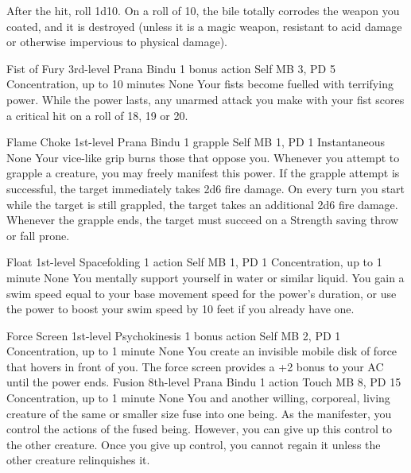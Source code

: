 After the hit, roll 1d10. On a roll of 10, the bile totally
corrodes the weapon you coated, and it is destroyed (unless
it is a magic weapon, resistant to acid damage or otherwise
impervious to physical damage).

\DndPowerHeader%
    {Fist of Fury\label{pwr:fist_of_fury}}
    {3rd-level Prana Bindu}
    {1 bonus action}
    {Self}
    {MB 3, PD 5}
    {Concentration, up to 10 minutes}
    {None}
Your fists become fuelled with terrifying
power. While the power lasts, any unarmed attack you make
with your fist scores a critical hit on a roll of 18, 19 or
20.

\DndPowerHeader%
    {Flame Choke\label{pwr:flame_choke}}
    {1st-level Prana Bindu}
    {1 grapple}
    {Self}
    {MB 1, PD 1}
    {Instantaneous}
    {None}
Your vice-like grip burns those that oppose
you. Whenever you attempt to grapple a creature, you may freely
manifest this power. If the grapple attempt
is successful, the target immediately takes 2d6 fire damage.
On every turn you start while the target is still grappled,
the target takes an additional 2d6 fire damage. Whenever the
grapple ends, the target must succeed on a Strength saving
throw or fall prone.

\DndPowerHeader%
    {Float\label{pwr:float}}
    {1st-level Spacefolding}
    {1 action}
    {Self}
    {MB 1, PD 1}
    {Concentration, up to 1 minute}
    {None}
You mentally support yourself in water or
similar liquid. You gain a swim speed equal to your base movement
speed for the power's duration, or use the power to boost
your swim speed by 10 feet if you already have one.

\DndPowerHeader%
    {Force Screen\label{pwr:force_screen}}
    {1st-level Psychokinesis}
    {1 bonus action}
    {Self}
    {MB 2, PD 1}
    {Concentration, up to 1 minute}
    {None}
You create an invisible mobile disk of force
that hovers in front of you. The force screen provides a +2
bonus to your AC until the power ends.
\DndPowerHeader%
    {Fusion\label{pwr:fusion}}
    {8th-level Prana Bindu}
    {1 action}
    {Touch}
    {MB 8, PD 15}
    {Concentration, up to 1 minute}
    {None}
You and another willing, corporeal, living
creature of the same or smaller size fuse into one being.
As the manifester, you control the actions of the fused being.
However, you can give up this control to the other creature.
Once you give up control, you cannot regain it unless the
other creature relinquishes it.

